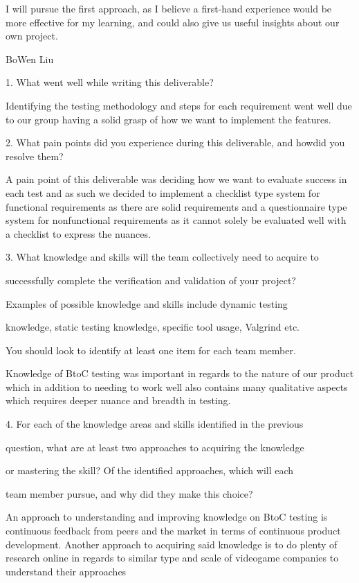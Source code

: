\documentclass[12pt, titlepage]{article}
\begin{document}
I will pursue the first approach, as I believe a first-hand experience would be more effective for my learning, and could also give us useful insights about our own project.

BoWen Liu

1. What went well while writing this deliverable?

Identifying the testing methodology and steps for each requirement went well due to our group having a solid grasp of how we want to implement the features.

2. What pain points did you experience during this deliverable, and howdid you resolve them?

A pain point of this deliverable was deciding how we want to evaluate success in each test and as such we decided to implement a checklist type system for functional requirements as there are solid requirements and a questionnaire type system for nonfunctional requirements as it cannot solely be evaluated well with a checklist to express the nuances.

3. What knowledge and skills will the team collectively need to acquire to

successfully complete the verification and validation of your project?

Examples of possible knowledge and skills include dynamic testing

knowledge, static testing knowledge, specific tool usage, Valgrind etc.

You should look to identify at least one item for each team member.

Knowledge of BtoC testing was important in regards to the nature of our product which in addition to needing to work well also contains many qualitative aspects which requires deeper nuance and breadth in testing.

4. For each of the knowledge areas and skills identified in the previous

question, what are at least two approaches to acquiring the knowledge

or mastering the skill? Of the identified approaches, which will each

team member pursue, and why did they make this choice?

An approach to understanding and improving knowledge on BtoC testing is continuous feedback from peers and the market in terms of continuous product development. Another approach to acquiring said knowledge is to do plenty of research online in regards to similar type and scale of videogame companies to understand their approaches
\end{document}
